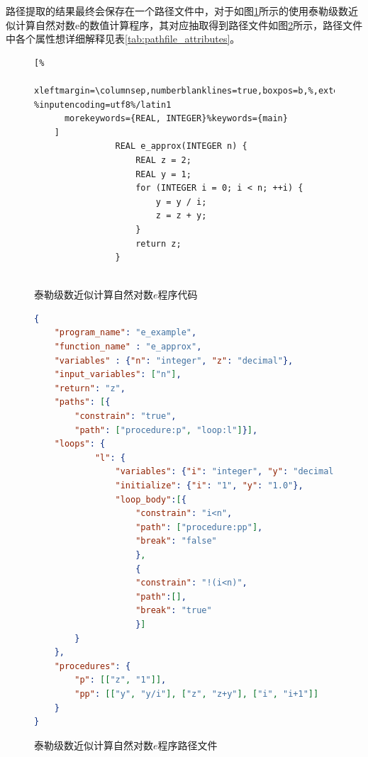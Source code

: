 路径提取的结果最终会保存在一个路径文件中，对于如图\ref{lst:e_example_code}所示的使用泰勒级数近似计算自然对数e的数值计算程序，其对应抽取得到路径文件如图\ref{lst:e_example_pathfile}所示，路径文件中各个属性想详细解释见表\ref{tab:pathfile_attributes}。


\begin{figure}[thbp]
    \begin{lstlisting}[%
      xleftmargin=\columnsep,numberblanklines=true,boxpos=b,%,extendedchars=\true, %inputencoding=utf8%/latin1
      morekeywords={REAL, INTEGER}%keywords={main}
    ]
                REAL e_approx(INTEGER n) {
                    REAL z = 2; 
                    REAL y = 1;
                    for (INTEGER i = 0; i < n; ++i) {
                        y = y / i;
                        z = z + y;
                    }
                    return z;
                }
    
    \end{lstlisting}
    \caption{泰勒级数近似计算自然对数$e$程序代码}
    \label{lst:e_example_code}
\end{figure}


\begin{figure}[thbp]
\begin{lstlisting}[language=json,firstnumber=1]
{
    "program_name": "e_example",
    "function_name" : "e_approx",
    "variables" : {"n": "integer", "z": "decimal"},
    "input_variables": ["n"],
    "return": "z",
    "paths": [{
        "constrain": "true", 
        "path": ["procedure:p", "loop:l"]}],
    "loops": {
            "l": {
                "variables": {"i": "integer", "y": "decimal"},
                "initialize": {"i": "1", "y": "1.0"},
                "loop_body":[{
                    "constrain": "i<n",
                    "path": ["procedure:pp"],
                    "break": "false"
                    },
                    {
                    "constrain": "!(i<n)",
                    "path":[],
                    "break": "true"
                    }]
        }
    },
    "procedures": {
        "p": [["z", "1"]],
        "pp": [["y", "y/i"], ["z", "z+y"], ["i", "i+1"]]
    }
}
\end{lstlisting}
\caption{泰勒级数近似计算自然对数$e$程序路径文件}
\label{lst:e_example_pathfile}
\end{figure}

